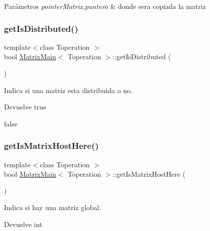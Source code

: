 \begin{DoxyParams}{Parámetros}
{\em pointer\+Matrix,puntero} & donde sera copiada la matriz \\
\hline
\end{DoxyParams}
\mbox{\label{classMatrixMain_aaa158ccbaecfba4cbafa36bc424f321e}} 
\subsubsection{\texorpdfstring{get\+Is\+Distributed()}{getIsDistributed()}}
{\footnotesize\ttfamily template$<$class Toperation $>$ \\
bool \hyperlink{classMatrixMain}{Matrix\+Main}$<$ Toperation $>$\+::get\+Is\+Distributed (\begin{DoxyParamCaption}{ }\end{DoxyParamCaption})}



Indica si una matriz esta distribuida o no. 

\begin{DoxyReturn}{Devuelve}
true 

false 
\end{DoxyReturn}
\mbox{\label{classMatrixMain_a6e00fc3ae8e8c9f0f4acafea1c277896}} 
\subsubsection{\texorpdfstring{get\+Is\+Matrix\+Host\+Here()}{getIsMatrixHostHere()}}
{\footnotesize\ttfamily template$<$class Toperation $>$ \\
bool \hyperlink{classMatrixMain}{Matrix\+Main}$<$ Toperation $>$\+::get\+Is\+Matrix\+Host\+Here (\begin{DoxyParamCaption}{ }\end{DoxyParamCaption})}



Indica si hay una matriz global. 

\begin{DoxyReturn}{Devuelve}
int 
\end{DoxyReturn}
\mbox{\label{classMatrixMain_a1b92a3021af1891db86cf8041cea5b84}} 
